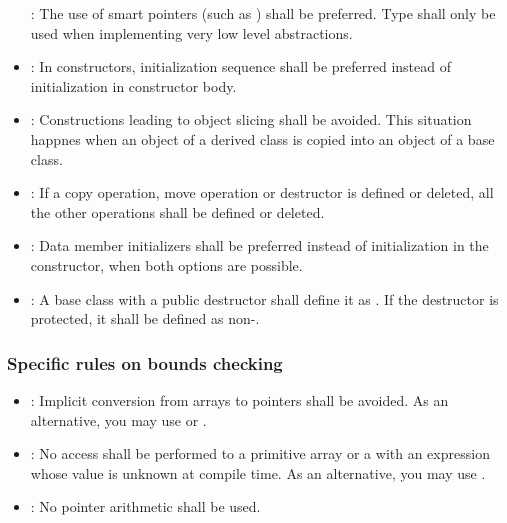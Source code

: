 \begin{itemize}
: 
The use of smart pointers (such as )
shall be preferred. Type  shall only be used
when implementing very low level abstractions.

\item {}:
In constructors, initialization sequence shall be preferred
instead of initialization in constructor body.

\item {}:
Constructions leading to object slicing shall be avoided.
This situation happnes when an object of a derived class is copied into an
object of a base class.

\item {}:
If a copy operation, move operation or destructor is defined or deleted, 
all the other operations shall be defined or deleted.

\item {}:
Data member initializers shall be preferred instead of initialization in the 
constructor, when both options are possible.

\item {}:
A base class with a public destructor shall define it as .
If the destructor is protected, it shall be defined as non-.

\end{itemize}

\subsubsection{Specific rules on bounds checking}

\begin{itemize}

\item {}:
Implicit conversion from arrays to pointers shall be avoided.
As an alternative, you may use
 or .

\item {}:
No access shall be performed to a primitive array or a 
with an expression whose value is unknown at compile time.
As an alternative, you may use 
.

\item {}:
No pointer arithmetic shall be used.

\end{itemize}

